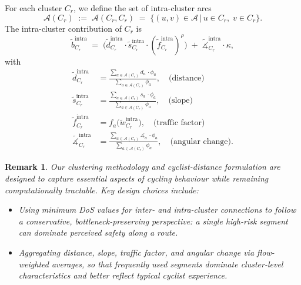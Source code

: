 \documentclass[lettersize,journal]{IEEEtran}
\newtheorem{remark}{Remark}
\begin{document}
For each cluster $C_r$, we define the set of intra-cluster arcs
\[
  \mathcal{A}(C_r)
  \;:=\;
  \mathcal{A}(C_r,C_r)
  \;=\;
  \bigl\{ (u,v) \in \mathcal{A} \,\big|\,
          u \in C_r,\; v \in C_r \bigr\}.
\]
The intra-cluster contribution of $C_r$ is
\begin{equation}
  \tilde{b}^{\mathrm{intra}}_{C_r}
  \;=\;
  \bigl(
    \tilde{d}^{\mathrm{intra}}_{C_r}
    \cdot
    \tilde{s}^{\mathrm{intra}}_{C_r}
    \cdot
    (\tilde{f}^{\mathrm{intra}}_{C_r})^{\rho}
  \bigr)
  \;+\;
  \tilde{\measuredangle}^{\mathrm{intra}}_{C_r} \cdot \kappa,
\end{equation}
with
\begin{align}
  \tilde{d}^{\mathrm{intra}}_{C_r}
  &=
  \frac{
    \sum_{a \in \mathcal{A}(C_r)} d_a \, \cdot \phi_a
  }{
    \sum_{a \in \mathcal{A}(C_r)} \phi_a
  },
  \quad\text{(distance)}\\[0.5em]
  \tilde{s}^{\mathrm{intra}}_{C_r}
  &=
  \frac{
    \sum_{a \in \mathcal{A}(C_r)} s_a \, \cdot \phi_a
  }{
    \sum_{a \in \mathcal{A}(C_r)} \phi_a
  },
  \quad\text{(slope)}\\[0.5em]
  \tilde{f}^{\mathrm{intra}}_{C_r}
  &=
  f_a\bigl(\tilde{w}^{\mathrm{intra}}_{C_r}\bigr),
  \quad\text{(traffic factor)}\\[0.5em]
  \tilde{\measuredangle}^{\mathrm{intra}}_{C_r}
  &=
  \frac{
    \sum_{a \in \mathcal{A}(C_r)} \measuredangle_a \, \cdot \phi_a
  }{
    \sum_{a \in \mathcal{A}(C_r)} \phi_a
  },
  \quad\text{(angular change)}.
\end{align}

\begin{remark}
Our clustering methodology and cyclist-distance formulation are designed to capture
essential aspects of cycling behaviour while remaining computationally tractable.
Key design choices include:
\begin{itemize}
  \item Using minimum DoS values for inter- and intra-cluster connections to follow a
  conservative, bottleneck-preserving perspective: a single high-risk segment can
  dominate perceived safety along a route.
  \item Aggregating distance, slope, traffic factor, and angular change via
  flow-weighted averages, so that frequently used segments dominate cluster-level
  characteristics and better reflect typical cyclist experience.
\end{itemize}
\end{remark}


\end{document}
